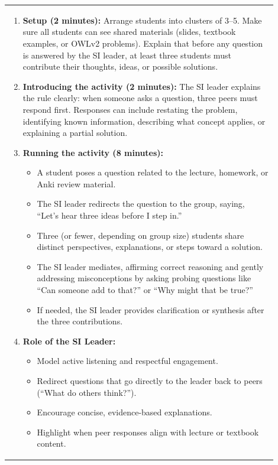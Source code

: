 \documentclass{article}
\begin{document}
{\begin{tabular}{|p{0.9\linewidth}|}
\begin{enumerate}
    \item \textbf{Setup (2 minutes):} Arrange students into clusters of 3--5. Make sure all students can see shared materials (slides, textbook examples, or OWLv2 problems). Explain that before any question is answered by the SI leader, at least three students must contribute their thoughts, ideas, or possible solutions.
    
    \item \textbf{Introducing the activity (2 minutes):} The SI leader explains the rule clearly: when someone asks a question, three peers must respond first. Responses can include restating the problem, identifying known information, describing what concept applies, or explaining a partial solution.
    
    \item \textbf{Running the activity (8 minutes):}
    \begin{itemize}
        \item A student poses a question related to the lecture, homework, or Anki review material.
        \item The SI leader redirects the question to the group, saying, “Let’s hear three ideas before I step in.”
        \item Three (or fewer, depending on group size) students share distinct perspectives, explanations, or steps toward a solution.
        \item The SI leader mediates, affirming correct reasoning and gently addressing misconceptions by asking probing questions like “Can someone add to that?” or “Why might that be true?”
        \item If needed, the SI leader provides clarification or synthesis after the three contributions.
    \end{itemize}
    
    \item \textbf{Role of the SI Leader:} 
    \begin{itemize}
        \item Model active listening and respectful engagement.
        \item Redirect questions that go directly to the leader back to peers (“What do others think?”).
        \item Encourage concise, evidence-based explanations.
        \item Highlight when peer responses align with lecture or textbook content.
    \end{itemize}
    

\end{enumerate}
\end{tabular}}
\end{document}
